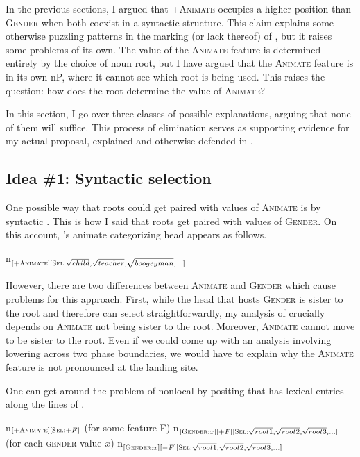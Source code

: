 \documentclass[output=paper
,newtxmath
,modfonts
,nonflat]{langsci/langscibook}
\begin{document}
In the previous sections, I argued that +\textsc{Animate} occupies a higher position than \textsc{Gender} when both coexist in a syntactic structure.  This claim explains some otherwise puzzling patterns in the marking (or lack thereof) of , but it raises some problems of its own.  The value of the \textsc{Animate} feature is determined entirely by the choice of noun root, but I have argued that the \textsc{Animate} feature is in its own nP, where it cannot see which root is being used.  This raises the question: how does the root determine the value of \textsc{Animate}?

In this section, I go over three classes of possible explanations, arguing that none of them will suffice.  This process of elimination serves as supporting evidence for my actual proposal, explained and otherwise defended in .

\subsection{Idea \#1: Syntactic selection} \label{sec:pesetsky:syntacticselectionidea}

One possible way that roots could get paired with values of \textsc{Animate} is by syntactic .  This is how I said that roots get paired with values of \textsc{Gender}.  On this account, 's animate categorizing head appears as follows.

\ea\label{ex:pesetsky:optiona}  n$_{[+\textsc{Animate}][\textsc{Sel}: \sqrt{child}, \sqrt{teacher}, \sqrt{boogeyman}, ...]}$  \z

However, there are two differences between \textsc{Animate} and \textsc{Gender} which cause problems for this approach.  First, while the head that hosts \textsc{Gender} is sister to the root and therefore can select straightforwardly, my analysis of  crucially depends on \textsc{Animate} not being sister to the root.  Moreover, \textsc{Animate} cannot move to be sister to the root.  Even if we could come up with an analysis involving lowering across two phase boundaries, we would have to explain why the \textsc{Animate} feature is not pronounced at the landing site.

One can get around the problem of nonlocal  by positing that  has lexical entries along the lines of .

\ea\label{ex:pesetsky:optionb} \ea n$_{[+\textsc{Animate}][\textsc{Sel}:+F]}$ (for some feature F) 
\ex  n$_{[\textsc{Gender}:x][+F][\textsc{Sel}: \sqrt{root1}, \sqrt{root2}, \sqrt{root3}, ...]}$ (for each \textsc{gender} value $x$) 
\ex n$_{[\textsc{Gender}:x][-F][\textsc{Sel}: \sqrt{root1}, \sqrt{root2}, \sqrt{root3}, ...]}$ \\ \z \z
\end{document}
